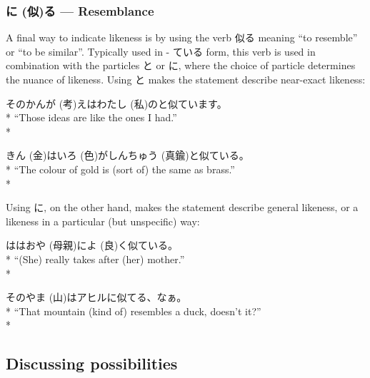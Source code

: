 \documentclass[11pt, b5paper, twoside, openright, onecolumn]{book}
\makeatletter
\newcommand*{\rubystack}[2]{{\relscale{0.5}%
  \begin{tabular}[b]{@{}c@{}}%
    {#1}\\%
   {\textscale{2}{#2}}%
  \end{tabular}}%
}
\DeclareRobustCommand*{\ruby}[2]{%
  \mbox{%
    \setlength{\parskip}{0ex}%
    \BeginAccSupp{method=pdfstringdef,ActualText={#1}}%
      \rubystack{\phantom{#2}}{#1}%
      \llap{%
        \rubystack{#2}{\phantom{#1}}%
      }%
    \EndAccSupp{}%
  }%
}
\renewcommand*{\ruby}[2]{#2 (#1)}%
\newenvironment{exampleblock}{
\setlength{\parindent}{0.6in}
\begin{minipage}[t]{\dimexpr\textwidth-\parindent}}
{\end{minipage}}
\makeatother
\begin{document}
\subsubsection{\ruby{似}{に}る — Resemblance}


A final way to indicate likeness is by using the verb 似る meaning “to resemble” or “to be similar”. Typically used in - ている form‚ this verb is used in combination with the particles と or に‚ where the choice of particle determines the nuance of likeness. Using と makes the statement describe near-exact likeness:

\vspace{0.4cm}
\begin{exampleblock}
その\ruby{考}{かんが}えは\ruby{私}{わたし}のと似ています。 \\* 
“Those ideas are like the ones I had.” \\* 
\end{exampleblock}
\vspace{0.2cm}

\begin{exampleblock}
\ruby{金}{きん}は\ruby{色}{いろ}が\ruby{真鍮}{しんちゅう}と似ている。 \\* 
“The colour of gold is (sort of) the same as brass.” \\* 
\end{exampleblock}
\vspace{0.2cm}

Using に‚ on the other hand‚ makes the statement describe general likeness‚ or a likeness in a particular (but unspecific) way:

\vspace{0.4cm}
\begin{exampleblock}
\ruby{母親}{ははおや}に\ruby{良}{よ}く似ている。 \\* 
“(She) really takes after (her) mother.” \\* 
\end{exampleblock}
\vspace{0.2cm}

\begin{exampleblock}
その\ruby{山}{やま}はアヒルに似てる、なぁ。 \\* 
“That mountain (kind of) resembles a duck‚ doesn’t it?” \\* 
\end{exampleblock}
\subsection{Discussing possibilities}
\end{document}
